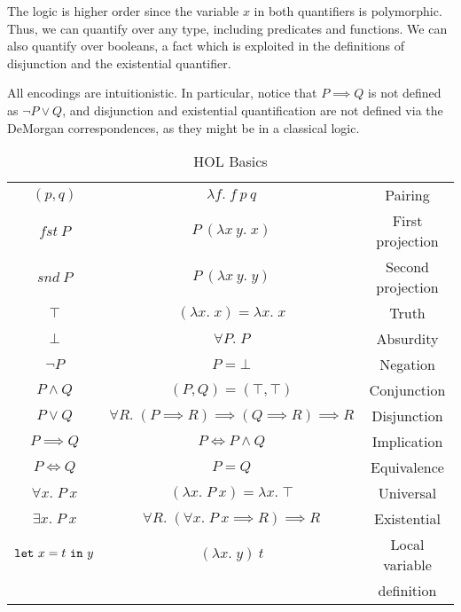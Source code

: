 The logic is higher order since the variable $x$ in both quantifiers is polymorphic. Thus, we can quantify over any type, including predicates and functions. We can also quantify over booleans, a fact which is exploited in the definitions of disjunction and the existential quantifier.

All encodings are intuitionistic. In particular, notice that \mbox{$P \implies Q$} is not defined as $\neg P \vee Q$, and disjunction and existential quantification are not defined via the DeMorgan correspondences, as they might be in a classical logic.

\begin{table}
\begin{center}
\begin{tabular}{|c|c|c|}
\hline
$(p,q)$          & $\lambda f.\; f\ p\ q$                  & Pairing\\
$fst\ P$         & $P\ (\lambda x\ y.\; x)$                & First projection\\
$snd\ P$         & $P\ (\lambda x\ y.\; y)$                & Second projection\\
$\top$           & $(\lambda x.\; x) = \lambda x.\; x$       & Truth\\
$\bot$           & $\forall P.\; P$                        & Absurdity\\
$\neg P$         & $P = \bot$                            & Negation\\
$P \wedge Q$     & $(P,Q) = (\top,\top)$                 & Conjunction\\
$P \vee Q$       & $\forall R.\; (P \implies R) \implies (Q \implies R) \implies R$  &Disjunction\\
$P \implies Q$   & $P \iff P \wedge Q$                   & Implication\\
$P \iff Q$       & $P = Q$                               & Equivalence\\
$\forall x.\; P\ x$ & $(\lambda x.\; P\ x) = \lambda x.\; \top$ & Universal\\
$\exists x.\; P\ x$ & $\forall R.\; (\forall x.\; P\ x \implies R) \implies R$ & Existential\\
$\code{let}\ x=t\ \code{in}\ y$ & $(\lambda x.\; y)\ t$ & Local variable\\
&& definition\\
\hline
\end{tabular}
\end{center}
\caption{HOL Basics}
\label{table:HOL}
\end{table}

